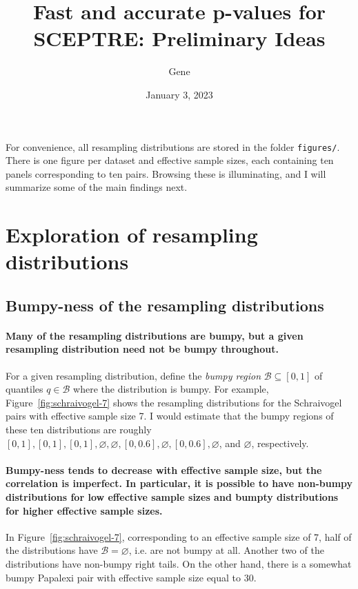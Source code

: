\documentclass[12pt]{article}
\begin{document}
\title{Fast and accurate p-values for SCEPTRE: Preliminary Ideas}
\author{Gene}
\date{January 3, 2023}

\maketitle
\thispagestyle{empty}

For convenience, all resampling distributions are stored in the folder \verb|figures/|. There is one figure per dataset and effective sample sizes, each containing ten panels corresponding to ten pairs. Browsing these is illuminating, and I will summarize some of the main findings next. 

\section[Exploration]{Exploration of resampling distributions}

\subsection{Bumpy-ness of the resampling distributions}

\paragraph{Many of the resampling distributions are bumpy, but a given resampling distribution need not be bumpy throughout.} For a given resampling distribution, define the \textit{bumpy region} $\mathcal B \subseteq [0,1]$ of quantiles $q \in \mathcal B$ where the distribution is bumpy. For example, Figure~\ref{fig:schraivogel-7}  shows the resampling distributions for the Schraivogel pairs with effective sample size 7. I would estimate that the bumpy regions of these ten distributions are roughly $[0,1], [0,1], [0,1], \varnothing, \varnothing, [0, 0.6], \varnothing, [0, 0.6], \varnothing$, and $\varnothing$, respectively.

\paragraph{Bumpy-ness tends to decrease with effective sample size, but the correlation is imperfect. In particular, it is possible to have non-bumpy distributions for low effective sample sizes and bumpty distributions for higher effective sample sizes.} In Figure~\ref{fig:schraivogel-7}, corresponding to an effective sample size of 7, half of the distributions have $\mathcal B = \varnothing$, i.e. are not bumpy at all. Another two of the distributions have non-bumpy right tails. On the other hand, there is a somewhat bumpy Papalexi pair with effective sample size equal to 30. 
\end{document}
